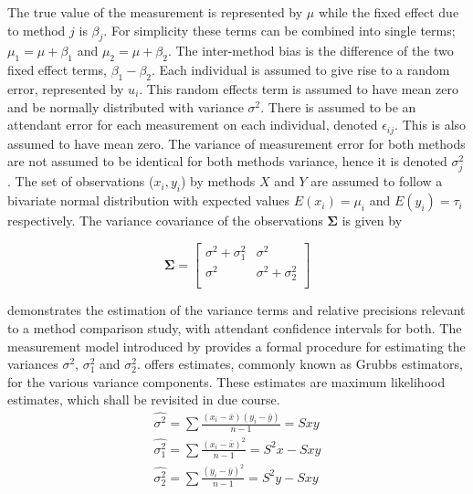 \documentclass[12pt, a4paper]{report}
\theoremstyle{plain}
\theoremstyle{definition}
\theoremstyle{remark}
\begin{document}
The true value of the measurement is represented by $\mu$ while the fixed effect due to method $j$ is $\beta_{j}$.
For simplicity these terms can be combined into single terms; $\mu_{1} = \mu+ \beta_{1}$ and $\mu_{2} = \mu + \beta_{2}$. The inter-method bias is the difference of the two fixed effect terms, $\beta_{1}-\beta_{2}$. Each individual is assumed to give rise to a random error, represented by $u_{i}$. This random effects term is assumed to have mean zero and be normally distributed with variance $\sigma^2$. There is assumed to be an attendant error for each measurement on each individual, denoted $\epsilon_{ij}$. This is also assumed to have mean zero. The variance of measurement error for both methods are not assumed to be identical for both methods variance,  hence it is denoted $\sigma^2_{j}$. The set of observations ($x_{i},y_{i}$) by methods $X$ and $Y$ are assumed to follow a bivariate normal distribution with expected values $E(x_{i})= \mu_{i}$ and $E(y_{i})= \tau_{i}$ respectively. The variance covariance of the observations $\boldsymbol{\Sigma}$ is given by

\[
\boldsymbol{\Sigma} = \left[
\begin{array}{cc}
\sigma^{2} + \sigma^{2}_{1} & \sigma^{2} \\
\sigma^{2} & \sigma^{2} + \sigma^{2}_{2} \\
\end{array}
\right]
\] 

\citet{Kinsella} demonstrates the estimation of the variance terms and relative precisions relevant to a method comparison study, with attendant confidence intervals for both. The measurement model introduced by \citet{Grubbs48,Grubbs73} provides a formal procedure for estimating the variances $\sigma^2$, $\sigma^2_{1}$ and $\sigma^2_{2}$. \citet{Grubbs48} offers estimates, commonly known as Grubbs estimators, for the various variance components. These estimates are maximum likelihood estimates, which shall be revisited in due course.
\begin{eqnarray*}
	\hat{\sigma^{2}} = \sum{\frac{(x_{i}-\bar{x})(y_{i}-\bar{y})}{n-1}} = Sxy\\
	\hat{\sigma^{2}_{1}} = \sum{\frac{(x_{i}-\bar{x})^{2}}{n-1}} =S^{2}x - Sxy  \\
	\hat{\sigma^{2}_{2}} =
	\sum{\frac{(y_{i}-\bar{y})^{2}}{n-1}} = S^{2}y - Sxy
\end{eqnarray*}
\end{document}
